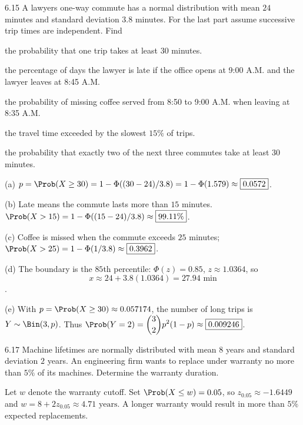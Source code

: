 \documentclass[11pt,oneside]{article}
\begin{document}
\begin{exercise}{6.15}
A lawyer\textquotesingle s one-way commute has a normal distribution with mean $24$ minutes and standard deviation $3.8$ minutes. For the last part assume successive trip times are independent. Find
\begin{exercisesubparts}
\item the probability that one trip takes at least $30$ minutes.
\item the percentage of days the lawyer is late if the office opens at 9:00 A.M. and the lawyer leaves at 8:45 A.M.
\item the probability of missing coffee served from 8:50 to 9:00 A.M. when leaving at 8:35 A.M.
\item the travel time exceeded by the slowest $15\%$ of trips.
\item the probability that exactly two of the next three commutes take at least $30$ minutes.
\end{exercisesubparts}
\end{exercise}

\begin{solution}
\noindent\textup{(a)} $p=\Prob(X\ge30)=1-\Phi((30-24)/3.8)=1-\Phi(1.579)\approx\boxed{0.0572}$.

\noindent\textup{(b)} Late means the commute lasts more than $15$ minutes. $\Prob(X>15)=1-\Phi((15-24)/3.8)\approx\boxed{99.11\%}$.

\noindent\textup{(c)} Coffee is missed when the commute exceeds $25$ minutes; $\Prob(X>25)=1-\Phi(1/3.8)\approx\boxed{0.3962}$.

\noindent\textup{(d)} The boundary is the $85$th percentile: $\Phi(z)=0.85$, $z\approx1.0364$, so \[\boxed{x\approx24+3.8(1.0364)=27.94\text{ min}}\].

\noindent\textup{(e)} With $p=\Prob(X\ge30)\approx0.057174$, the number of long trips is $Y\sim\Bin(3,p)$. Thus $\Prob(Y=2)=\displaystyle\binom32p^2(1-p)\approx\boxed{0.009246}$.
\end{solution}

\begin{exercise}{6.17}
Machine lifetimes are normally distributed with mean $8$ years and standard deviation $2$ years. An engineering firm wants to replace under warranty no more than $5\%$ of its machines. Determine the warranty duration.
\end{exercise}

\begin{solution}
Let $w$ denote the warranty cutoff. Set $\Prob(X\le w)=0.05$, so $z_{0.05}\approx-1.6449$ and $\boxed{w=8+2z_{0.05}\approx4.71\text{ years}}$. A longer warranty would result in more than $5\%$ expected replacements.
\end{solution}
\end{document}
